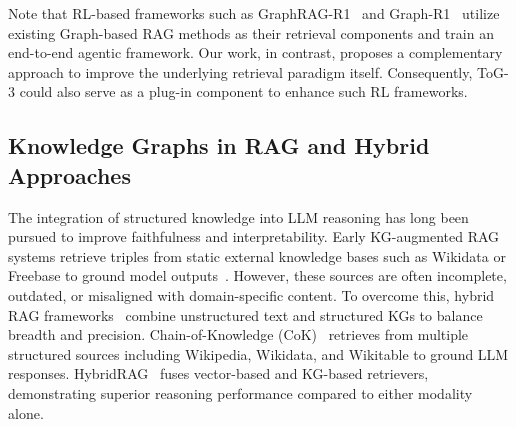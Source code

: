 Note that RL-based frameworks such as GraphRAG-R1~\citep{yu2025graphrag-r1} and Graph-R1~\citep{luo2025graph-r1} utilize existing Graph-based RAG methods as their retrieval components and train an end-to-end agentic framework. Our work, in contrast, proposes a complementary approach to improve the underlying retrieval paradigm itself. Consequently, ToG-3 could also serve as a plug-in component to enhance such RL frameworks.

\subsection{Knowledge Graphs in RAG and Hybrid Approaches}

The integration of structured knowledge into LLM reasoning has long been pursued to improve faithfulness and interpretability. 
Early KG-augmented RAG systems retrieve triples from static external knowledge bases such as Wikidata or Freebase to ground model outputs~\citep{sun2023tog}. However, these sources are often incomplete, outdated, or misaligned with domain-specific content. To overcome this, hybrid RAG frameworks~\citep{ma2024tog2} combine unstructured text and structured KGs to balance breadth and precision.
Chain-of-Knowledge (CoK)~\citep{li2024cok} retrieves from multiple structured sources including Wikipedia, Wikidata, and Wikitable to ground LLM responses. HybridRAG~\citep{sarmah2024hybridrag} fuses vector-based and KG-based retrievers, demonstrating superior reasoning performance compared to either modality alone. 


